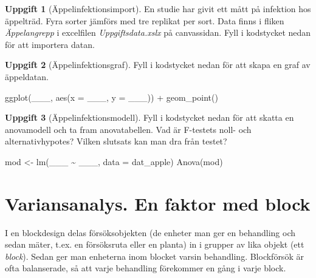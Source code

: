\documentclass[
]{book}
\newenvironment{Shaded}{\begin{snugshade}}{\end{snugshade}}
\newcommand{\AttributeTok}[1]{\textcolor[rgb]{0.77,0.63,0.00}{#1}}
\newcommand{\FunctionTok}[1]{\textcolor[rgb]{0.00,0.00,0.00}{#1}}
\newcommand{\NormalTok}[1]{#1}
\newcommand{\OtherTok}[1]{\textcolor[rgb]{0.56,0.35,0.01}{#1}}
\newcommand{\SpecialCharTok}[1]{\textcolor[rgb]{0.00,0.00,0.00}{#1}}
\theoremstyle{definition}
\theoremstyle{definition}
\theoremstyle{definition}
\newtheorem{exercise}{Uppgift}[chapter]
\theoremstyle{definition}
\theoremstyle{remark}
\begin{document}
\begin{exercise}[Äppelinfektionsimport]
En studie har givit ett mått på infektion hos äppelträd. Fyra sorter jämförs med tre replikat per sort. Data finns i fliken \emph{Äppelangrepp} i excelfilen \emph{Uppgiftsdata.xslx} på canvassidan. Fyll i kodstycket nedan för att importera datan.
\end{exercise}

\begin{exercise}[Äppelinfektionsgraf]

Fyll i kodstycket nedan för att skapa en graf av äppeldatan.

\begin{Shaded}
\begin{Highlighting}[]
\FunctionTok{ggplot}\NormalTok{(\_\_\_, }\FunctionTok{aes}\NormalTok{(}\AttributeTok{x =}\NormalTok{ \_\_\_, }\AttributeTok{y =}\NormalTok{ \_\_\_)) }\SpecialCharTok{+}
  \FunctionTok{geom\_point}\NormalTok{()}
\end{Highlighting}
\end{Shaded}

\end{exercise}

\begin{exercise}[Äppelinfektionsmodell]

Fyll i kodstycket nedan för att skatta en anovamodell och ta fram anovatabellen. Vad är F-testets noll- och alternativhypotes? Vilken slutsats kan man dra från testet?

\begin{Shaded}
\begin{Highlighting}[]
\NormalTok{mod }\OtherTok{\textless{}{-}} \FunctionTok{lm}\NormalTok{(\_\_\_ }\SpecialCharTok{\textasciitilde{}}\NormalTok{ \_\_\_, }\AttributeTok{data =}\NormalTok{ dat\_apple)}
\FunctionTok{Anova}\NormalTok{(mod)}
\end{Highlighting}
\end{Shaded}

\end{exercise}

\hypertarget{variansanalys.-en-faktor-med-block}{%
\section{Variansanalys. En faktor med block}\label{variansanalys.-en-faktor-med-block}}

I en blockdesign delas försöksobjekten (de enheter man ger en behandling och sedan mäter, t.ex. en försöksruta eller en planta) in i grupper av lika objekt (ett \emph{block}). Sedan ger man enheterna inom blocket varsin behandling. Blockförsök är ofta balanserade, så att varje behandling förekommer en gång i varje block.
\end{document}
